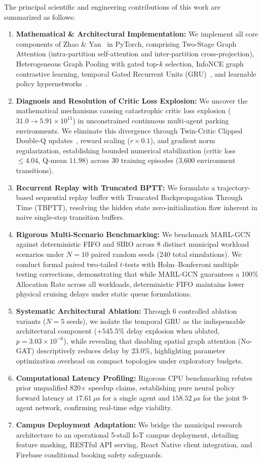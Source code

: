 \documentclass[journal]{IEEEtran}
\begin{document}
The principal scientific and engineering contributions of this work are summarized as follows:
\begin{enumerate}
    \item \textbf{Mathematical \& Architectural Implementation:} We implement all core components of Zhao \& Yan~\cite{zhao2025deep} in PyTorch, comprising Two-Stage Graph Attention (intra-partition self-attention and inter-partition cross-projection), Heterogeneous Graph Pooling with gated top-$k$ selection, InfoNCE graph contrastive learning, temporal Gated Recurrent Units (GRU)~\cite{cho2014learning}, and learnable policy hypernetworks~\cite{ha2017hypernetworks}.
    \item \textbf{Diagnosis and Resolution of Critic Loss Explosion:} We uncover the mathematical mechanisms causing catastrophic critic loss explosion ($31.0 \to 5.91 \times 10^{11}$) in unconstrained continuous multi-agent parking environments. We eliminate this divergence through Twin-Critic Clipped Double-Q updates~\cite{fujimoto2018addressing}, reward scaling ($r \times 0.1$), and gradient norm regularization, establishing bounded numerical stabilization (critic loss $\le 4.04$, Q-mean $11.98$) across 30 training episodes (3,600 environment transitions).
    \item \textbf{Recurrent Replay with Truncated BPTT:} We formulate a trajectory-based sequential replay buffer with Truncated Backpropagation Through Time (TBPTT), resolving the hidden state zero-initialization flaw inherent in naive single-step transition buffers.
    \item \textbf{Rigorous Multi-Scenario Benchmarking:} We benchmark MARL-GCN against deterministic FIFO and SIRO across 8 distinct municipal workload scenarios under $N=10$ paired random seeds (240 total simulations). We conduct formal paired two-tailed $t$-tests with Holm--Bonferroni multiple testing corrections, demonstrating that while MARL-GCN guarantees a 100\% Allocation Rate across all workloads, deterministic FIFO maintains lower physical cruising delays under static queue formulations.
    \item \textbf{Systematic Architectural Ablation:} Through 6 controlled ablation variants ($N=5$ seeds), we isolate the temporal GRU as the indispensable architectural component ($+545.5\%$ delay explosion when ablated, $p = 3.03 \times 10^{-6}$), while revealing that disabling spatial graph attention (No-GAT) descriptively reduces delay by 23.0\%, highlighting parameter optimization overhead on compact topologies under exploratory budgets.
    \item \textbf{Computational Latency Profiling:} Rigorous CPU benchmarking refutes prior unqualified 820$\times$ speedup claims, establishing pure neural policy forward latency at $17.61~\mu$s for a single agent and $158.52~\mu$s for the joint 9-agent network, confirming real-time edge viability.
    \item \textbf{Campus Deployment Adaptation:} We bridge the municipal research architecture to an operational 5-stall IoT campus deployment, detailing feature masking, RESTful API serving, React Native client integration, and Firebase conditional booking safety safeguards.
\end{enumerate}
\end{document}
